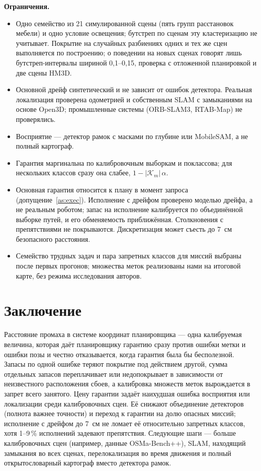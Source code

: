 \textbf{Ограничения.}
\begin{itemize}[nosep]
  \item Одно семейство из 21 симулированной сцены (пять групп расстановок мебели) и одно условие освещения; бутстреп по сценам эту кластеризацию не учитывает. Покрытие на случайных разбиениях одних и тех же сцен выполняется по построению; о поведении на новых сценах говорят лишь бутстреп-интервалы шириной 0,1--0,15, проверка с отложенной планировкой и две сцены HM3D.
  \item Основной дрейф синтетический и не зависит от ошибок детектора. Реальная локализация проверена одометрией и собственным SLAM с замыканиями на основе Open3D; промышленные системы (ORB-SLAM3, RTAB-Map) не проверялись.
  \item Восприятие --- детектор рамок с масками по глубине или MobileSAM, а не полный картограф.
  \item Гарантия маргинальна по калибровочным выборкам и поклассова; для нескольких классов сразу она слабее, $1 - |\mathcal K_m|\,\alpha$.
  \item Основная гарантия относится к плану в момент запроса (допущение~\ref{as:exec}). Исполнение с дрейфом проверено моделью дрейфа, а не реальным роботом; запас на исполнение калибруется по объединённой выборке путей, и его обменяемость приближённая. Столкновения с препятствиями не покрываются. Дискретизация может съесть до 7~см безопасного расстояния.
  \item Семейство трудных задач и пара запретных классов для миссий выбраны после первых прогонов; множества меток реализованы нами на итоговой карте, без режима исследования авторов.
\end{itemize}

\section{Заключение}

Расстояние промаха в системе координат планировщика --- одна калибруемая величина, которая даёт планировщику гарантию сразу против ошибки метки и ошибки позы и честно отказывается, когда гарантия была бы бесполезной. Запасы по одной ошибке теряют покрытие под действием другой, сумма отдельных запасов переплачивает или недопокрывает в зависимости от неизвестного расположения сбоев, а калибровка множеств меток вырождается в запрет всего занятого. Цену гарантии задаёт наихудшая ошибка восприятия или локализации среди калибровочных сцен. Её снижают объединение детекторов (полнота важнее точности) и переход к гарантии на долю опасных миссий; исполнение с дрейфом до 7~см не ломает её относительно запретных классов, хотя 1--9\,\% исполнений задевают препятствия. Следующие шаги --- больше калибровочных сцен (например, данные OSMa-Bench++), SLAM, находящий замыкания во всех сценах, перелокализация во время движения и полный открытословарный картограф вместо детектора рамок.
